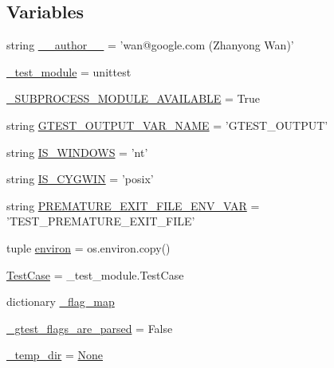 \subsection*{Variables}
\begin{DoxyCompactItemize}
\item 
string \hyperlink{namespacegtest__test__utils_a221c8f3baa0a26c6158106b76d51e9ce}{\-\_\-\-\_\-author\-\_\-\-\_\-} = 'wan@google.\-com (Zhanyong Wan)'
\item 
\hyperlink{namespacegtest__test__utils_aa19abf2658f4160d2fcb6ce94d16612c}{\-\_\-test\-\_\-module} = unittest
\item 
\hyperlink{namespacegtest__test__utils_af29139d2934cf1c6da2af020a399c36e}{\-\_\-\-S\-U\-B\-P\-R\-O\-C\-E\-S\-S\-\_\-\-M\-O\-D\-U\-L\-E\-\_\-\-A\-V\-A\-I\-L\-A\-B\-L\-E} = True
\item 
string \hyperlink{namespacegtest__test__utils_aeb3755b4dd33aabe1baee781fecc1e66}{G\-T\-E\-S\-T\-\_\-\-O\-U\-T\-P\-U\-T\-\_\-\-V\-A\-R\-\_\-\-N\-A\-M\-E} = 'G\-T\-E\-S\-T\-\_\-\-O\-U\-T\-P\-U\-T'
\item 
string \hyperlink{namespacegtest__test__utils_a7555b17006f1c078cda336750b8613e0}{I\-S\-\_\-\-W\-I\-N\-D\-O\-W\-S} = 'nt'
\item 
string \hyperlink{namespacegtest__test__utils_a6a936096debb3c2e807d000f76245740}{I\-S\-\_\-\-C\-Y\-G\-W\-I\-N} = 'posix'
\item 
string \hyperlink{namespacegtest__test__utils_aa961c38a16224b2e7fd8c93fc1d2a90f}{P\-R\-E\-M\-A\-T\-U\-R\-E\-\_\-\-E\-X\-I\-T\-\_\-\-F\-I\-L\-E\-\_\-\-E\-N\-V\-\_\-\-V\-A\-R} = 'T\-E\-S\-T\-\_\-\-P\-R\-E\-M\-A\-T\-U\-R\-E\-\_\-\-E\-X\-I\-T\-\_\-\-F\-I\-L\-E'
\item 
tuple \hyperlink{namespacegtest__test__utils_abe5d1d27c225592317b5bda5b4309471}{environ} = os.\-environ.\-copy()
\item 
\hyperlink{namespacegtest__test__utils_acb97a85206c09d233db6c7f2362e5428}{Test\-Case} = \-\_\-test\-\_\-module.\-Test\-Case
\item 
dictionary \hyperlink{namespacegtest__test__utils_a2493ee5c4436cfb8b6746e3da0a5d9a1}{\-\_\-flag\-\_\-map}
\item 
\hyperlink{namespacegtest__test__utils_a123ea2b70f6aaf7849d58e68b87a8131}{\-\_\-gtest\-\_\-flags\-\_\-are\-\_\-parsed} = False
\item 
\hyperlink{namespacegtest__test__utils_a63e521665d381cdeddd27066f11bdbbf}{\-\_\-temp\-\_\-dir} = \hyperlink{class_none}{None}
\end{DoxyCompactItemize}


